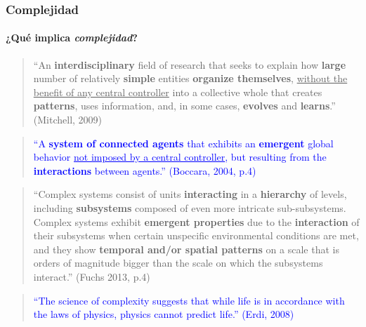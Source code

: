 \documentclass[11pt]{beamer}
\begin{document}
\begin{frame}
\frametitle{Complejidad}
\framesubtitle{¿Qué implica \textit{complejidad}?}
\hline
\begin{quote}
\footnotesize    ``An \textbf{interdisciplinary} field of research that seeks to explain how \textbf{large} number of relatively \textbf{simple} entities \textbf{organize themselves}, \underline{without the benefit of any central controller} into a collective whole that creates \textbf{patterns}, uses information, and, in some cases, \textbf{evolves} and \textbf{learns}.'' (Mitchell, 2009)
\end{quote}
\hline
\begin{quote}
 \footnotesize   \textcolor{blue}{``A \textbf{system of connected agents} that exhibits an \textbf{emergent} global behavior \underline{not imposed by a central controller}, but resulting from the \textbf{interactions} between agents.'' (Boccara, 2004, p.4)}
\end{quote}
\hline
\begin{quote}
 \footnotesize   ``Complex systems consist of units \textbf{interacting} in a \textbf{hierarchy} of levels, including \textbf{subsystems} composed of even more intricate sub-subsystems. Complex systems exhibit \textbf{emergent properties} due to the \textbf{interaction} of their subsystems when certain unspecific environmental conditions are met, and they show \textbf{temporal and/or spatial patterns} on a scale that is orders of magnitude bigger than the scale on which the subsystems interact.'' (Fuchs 2013, p.4)
\end{quote}
\hline
\begin{quote}
 \footnotesize  \textcolor{blue}{``The science of complexity suggests that while life is in accordance with the laws of physics, physics cannot predict life.'' (Erdi, 2008)}
\end{quote}    
\hline


\begin{comment}
    \begin{frame}
\frametitle{Complexity}
\framesubtitle{Some important aspects}
\begin{itemize}
\item Diversity/variety
\item High Non-linearity
\item Hierarchy
\item Non-Predictability
\item Interactions (at micro and macro
level)
\item Network
\item Self organization
\item Adaptive system
\item Emergence
\item Learning and information
computation
\item Evolution
\end{itemize}
\end{frame}
\end{comment}



\end{frame}
\end{document}
